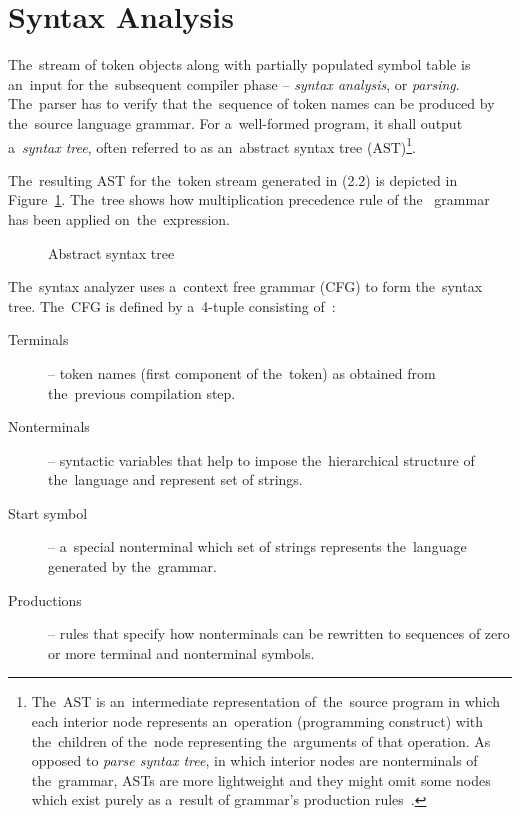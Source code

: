 \documentclass[
  digital, %
  table,   %
  lof,     %
  lot,     %
  oneside,
]{fithesis3}
\begin{document}
  \section{Syntax Analysis}
The~stream of token objects along with partially populated symbol table is an~input for the~subsequent compiler phase -- \textit{syntax analysis}, or \textit{parsing}. The~parser has to verify that the~sequence of token names can be produced by the~source language grammar. For a~well-formed program, it shall output a~\textit{syntax tree}, often referred to as an~abstract syntax tree (AST)\footnote{The~AST is an~intermediate representation of~the~source program in which each interior node represents an~operation (programming construct) with the~children of the~node representing the~arguments of that operation. As opposed to \textit{parse syntax tree}, in which interior nodes are nonterminals of the~grammar, ASTs are more lightweight and they might omit some nodes which exist purely as a~result of grammar's production rules~\cite{secure-programming-with-sca}.}.

The~resulting AST for the~token stream generated in (2.2) is depicted in Figure~\ref{fig:compilers-abstract-syntax-tree}. The~tree shows how multiplication precedence rule of the~ grammar has been applied on~the~expression.

\begin{figure}
  \centering
  \caption{Abstract syntax tree}
  \label{fig:compilers-abstract-syntax-tree}
\end{figure}

The~syntax analyzer uses a~context free grammar (CFG) to form the~syntax tree. The~CFG is defined by a~4-tuple consisting of~\cite{dragon-book}:
\begin{description}
  \item[Terminals] -- token names (first component of the~token) as obtained from the~previous compilation step.
  \item[Nonterminals] -- syntactic variables that help to impose the~hierarchical structure of the~language and represent set of strings.
  \item[Start symbol] -- a~special nonterminal which set of strings represents the~language generated by the~grammar.
  \item[Productions] -- rules that specify how nonterminals can be rewritten to sequences of zero or more terminal and nonterminal symbols. 
\end{description}
\end{document}
